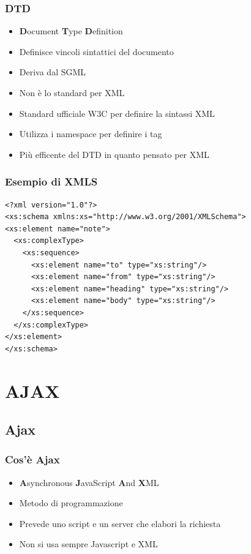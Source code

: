 \documentclass{beamer}
\begin{document}
\begin{frame}
    \frametitle{DTD}
    \begin{itemize}
    \item <1-> \textbf{D}ocument \textbf{T}ype \textbf{D}efinition
    \item <2-> Definisce vincoli sintattici del documento
    \item <3-> Deriva dal SGML
    \item <5-> Non è lo standard per XML
    \end{itemize}
\end{frame}

\begin{frame}
\begin{itemize}
    \item <1-> Standard ufficiale W3C per definire la sintassi XML
    \item <2-> Utilizza i namespace per definire i tag
    \item <3-> Più efficente del DTD in quanto pensato per XML
\end{itemize}
\end{frame}

\begin{frame}[fragile]
\frametitle{Esempio di XMLS}
\begin{verbatim}
<?xml version="1.0"?>
<xs:schema xmlns:xs="http://www.w3.org/2001/XMLSchema">
<xs:element name="note">
  <xs:complexType>
    <xs:sequence>
      <xs:element name="to" type="xs:string"/>
      <xs:element name="from" type="xs:string"/>
      <xs:element name="heading" type="xs:string"/>
      <xs:element name="body" type="xs:string"/>
    </xs:sequence>
  </xs:complexType>
</xs:element>
</xs:schema>
\end{verbatim}
\end{frame}


\section{AJAX}
\subsection{Ajax}
\begin{frame}
    \frametitle{Cos'è Ajax}
    \begin{itemize}
    \item <1-> \textbf{A}synchronous \textbf{J}avaScript \textbf{A}nd \textbf{X}ML
    \item <2-> Metodo di programmazione 
    \item <3-> Prevede uno script e un server che elabori la richiesta
    \item <4-> Non si usa sempre Javascript e XML
    \end{itemize}
\end{frame}
\end{document}
